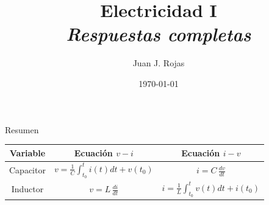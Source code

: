 \documentclass[aspectratio=169]{beamer}
\title{Electricidad I \\ \emph{Respuestas completas}}
\author{
    Juan J. Rojas
}
\institute{Instituto Tecnológico de Costa Rica}
\date{\today}
\begin{document}
\maketitle
{} %

\begin{frame}{Resumen}
    \begin{center}
        \begin{tabularx}{14cm}{C C C}
        \toprule
        Variable & Ecuación $v-i$ & Ecuación $i-v$ \\
        \midrule
       Capacitor & $v=\frac{1}{C}\int_{t_0}^{t} i(t)dt + v(t_0) $ & $i = C\,\frac{dv}{dt}$ \\[5pt]
        Inductor & $v = L\,\frac{di}{dt}$ & $i=\frac{1}{L}\int_{t_0}^{t} v(t)dt + i(t_0) $\\[5pt]
        \bottomrule
        \end{tabularx}   
    \end{center}
\end{frame}
\end{document}
